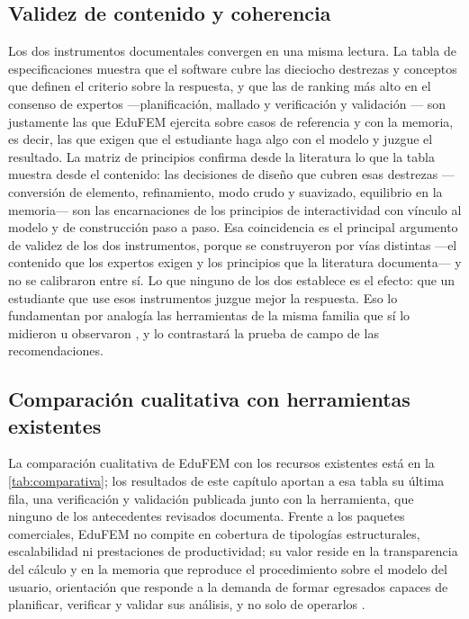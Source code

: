 \subsection{Validez de contenido y coherencia}

Los dos instrumentos documentales convergen en una misma lectura. La tabla de especificaciones muestra que el software cubre las dieciocho destrezas y conceptos que definen el criterio sobre la respuesta, y que las de ranking más alto en el consenso de expertos —planificación, mallado y verificación y validación \autocite[p.~1168]{perezsantiago2023fem}— son justamente las que EduFEM ejercita sobre casos de referencia y con la memoria, es decir, las que exigen que el estudiante haga algo con el modelo y juzgue el resultado. La matriz de principios confirma desde la literatura lo que la tabla muestra desde el contenido: las decisiones de diseño que cubren esas destrezas —conversión de elemento, refinamiento, modo crudo y suavizado, equilibrio en la memoria— son las encarnaciones de los principios de interactividad con vínculo al modelo y de construcción paso a paso. Esa coincidencia es el principal argumento de validez de los dos instrumentos, porque se construyeron por vías distintas —el contenido que los expertos exigen y los principios que la literatura documenta— y no se calibraron entre sí. Lo que ninguno de los dos establece es el efecto: que un estudiante que use esos instrumentos juzgue mejor la respuesta. Eso lo fundamentan por analogía las herramientas de la misma familia que sí lo midieron u observaron \autocites[pp.~4-5, 13]{bishay2020teaching}[p.~168]{lee2015interactive}, y lo contrastará la prueba de campo de las recomendaciones.

\subsection{Comparación cualitativa con herramientas existentes}

La comparación cualitativa de EduFEM con los recursos existentes está en la \autoref{tab:comparativa}; los resultados de este capítulo aportan a esa tabla su última fila, una verificación y validación publicada junto con la herramienta, que ninguno de los antecedentes revisados documenta. Frente a los paquetes comerciales, EduFEM no compite en cobertura de tipologías estructurales, escalabilidad ni prestaciones de productividad; su valor reside en la transparencia del cálculo y en la memoria que reproduce el procedimiento sobre el modelo del usuario, orientación que responde a la demanda de formar egresados capaces de planificar, verificar y validar sus análisis, y no solo de operarlos \autocite[pp.~1159, 1168]{perezsantiago2023fem}.

